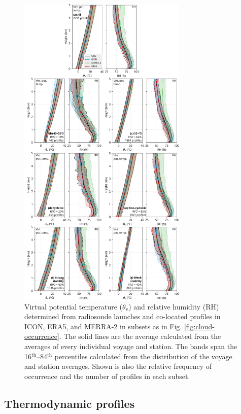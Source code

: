 \documentclass[draft]{agujournal2019}
\begin{document}
\begin{figure}[p!]
\centering
\includegraphics[width=0.72\textwidth]{img/theta_hur.pdf}
\caption{
Virtual potential temperature ($\theta_v$) and relative humidity (RH) determined from radiosonde launches and co-located profiles in ICON, ERA5, and MERRA-2 in subsets as in Fig. \ref{fig:cloud-occurrence}. The solid lines are the average calculated from the averages of every individual voyage and station. The bands span the 16$^\mathrm{th}$--84$^\mathrm{th}$ percentiles calculated from the distribution of the voyage and station averages. Shown is also the relative frequency of occurrence and the number of profiles in each subset.
}
\label{fig:potential-temperature}
\end{figure}

\subsection{Thermodynamic profiles}
\end{document}
